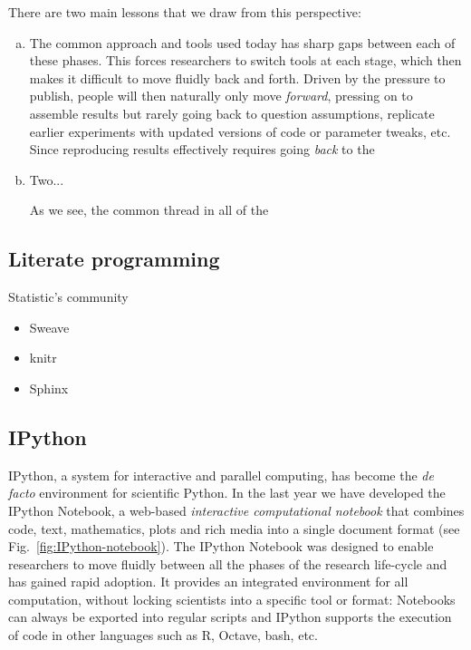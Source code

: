 \documentclass[ChapterTOCs,krantz2]{krantz} %
\begin{document}
There are two main lessons that we draw from this perspective:

\begin{enumerate}[(a)]
  \item The common approach and tools used today has sharp gaps between each of
    these phases.  This forces researchers to switch tools at each stage, which
    then makes it difficult to move fluidly back and forth.  Driven by the
    pressure to publish, people will then naturally only move \emph{forward},
    pressing on to assemble results but rarely going back to question
    assumptions, replicate earlier experiments with updated versions of code or
    parameter tweaks, etc.  Since reproducing results effectively requires
    going \emph{back} to the 

  \item Two...
    
As we see, the common thread in all of the
\end{enumerate}

\subsection{Literate programming}

Statistic's community
\begin{itemize}
\item Sweave
\item knitr
\item Sphinx
\end{itemize}

\subsection{IPython}


IPython, a system for interactive and parallel computing, has become the \emph{
  de facto} environment for scientific Python. In the last year we have
developed the IPython Notebook, a web-based \emph{ interactive computational
  notebook} that combines code, text, mathematics, plots and rich media into a
single document format (see Fig.~\ref{fig:IPython-notebook}).  The IPython
Notebook was designed to enable researchers to move fluidly between all the
phases of the research life-cycle and has gained rapid adoption. It provides an
integrated environment for all computation, without locking scientists into a
specific tool or format: Notebooks can always be exported into regular scripts
and IPython supports the execution of code in other languages such as R,
Octave, bash, etc.
\end{document}
